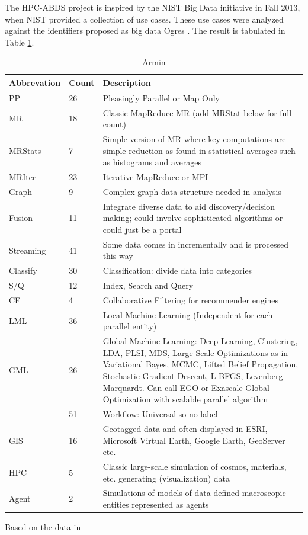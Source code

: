 \documentclass[runningheads,a4paper]{llncs}
\begin{document}
The HPC-ABDS project is inspired by the NIST Big Data initiative in Fall 2013, when NIST provided a collection of use cases. These use cases were analyzed against the identifiers proposed as big data Ogres \cite{fox2014towards}. The result is tabulated in Table \ref{table:NIST_vs_ogres}.
\begin{table}
	\centering
	\caption{Armin}
	\begin{tabular}{ |p{2cm}|p{1.5cm}|p{8cm}|  }
		\hline
		Abbrevation & Count & Description \\
		\hline
		PP & 26 & Pleasingly Parallel or Map Only \\
		\hline
		MR & 18 & Classic MapReduce MR (add MRStat below for full count) \\
		\hline
		MRStats & 7 & Simple version of MR where key computations are simple reduction as found in
statistical averages such as histograms and averages \\
\hline
MRIter & 23 & Iterative MapReduce or MPI \\
\hline
Graph & 9 & Complex graph data structure needed in analysis \\
\hline
Fusion & 11 & Integrate diverse data to aid discovery/decision making; could involve sophisticated
algorithms or could just be a portal \\
\hline
Streaming & 41 & Some data comes in incrementally and is processed this way \\
\hline
Classify & 30 & Classification: divide data into categories\\
\hline
S/Q & 12 & Index, Search and Query\\
\hline
CF & 4 & Collaborative Filtering for recommender engines \\
\hline
LML & 36 & Local Machine Learning (Independent for each parallel entity) \\
\hline
GML & 26 & Global Machine Learning: Deep Learning, Clustering, LDA, PLSI, MDS, Large
Scale Optimizations as in Variational Bayes, MCMC, Lifted Belief Propagation,
Stochastic Gradient Descent, L-BFGS, Levenberg-Marquardt. Can call EGO or
Exascale Global Optimization with scalable parallel algorithm \\
\hline
 & 51 & Workflow: Universal so no label \\
\hline 
 GIS & 16 & Geotagged data and often displayed in ESRI, Microsoft Virtual Earth, Google
Earth, GeoServer etc. \\
\hline
HPC & 5 & Classic large-scale simulation of cosmos, materials, etc. generating (visualization)
data \\
\hline
Agent & 2 & Simulations of models of data-defined macroscopic entities represented as agents \\
\hline

	\end{tabular}
	\label{table:NIST_vs_ogres}
\end{table}
Based on the data in
\newpage
\end{document}
